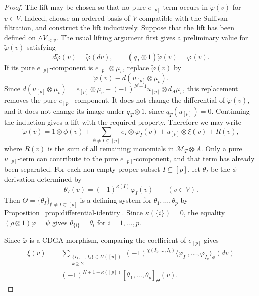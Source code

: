 \documentclass[a4paper,10pt]{amsart}
\theoremstyle{definition}
\theoremstyle{remark}
\numberwithin{equation}{section}
\begin{document}
\begin{proof}
The lift may be chosen so that no pure $e_{[p]}$-term occurs in
$\widetilde\varphi(v)$ for $v\in V$.
Indeed, choose an ordered basis of $V$ compatible with the Sullivan
filtration, and construct the lift inductively.
Suppose that the lift has been defined on $\wedge V_{<v}$.
The usual lifting argument first gives a preliminary value for
$\widetilde\varphi(v)$ satisfying
\[
d\widetilde\varphi(v)=\widetilde\varphi(dv),
\qquad
(q_T\otimes1)\widetilde\varphi(v)=\varphi(v).
\]
If its pure $e_{[p]}$-component is $e_{[p]}\otimes\mu_v$, replace
$\widetilde\varphi(v)$ by
\[
\widetilde\varphi(v)-d(u_{[p]}\otimes\mu_v).
\]
Since
$
d(u_{[p]}\otimes\mu_v)
=
e_{[p]}\otimes\mu_v
+
(-1)^{N-1}u_{[p]}\otimes d_A\mu_v$,
this replacement removes the pure $e_{[p]}$-component. It does not change
the differential of $\widetilde\varphi(v)$, and it does not change its image
under $q_T\otimes1$, since $q_T(u_{[p]})=0$.
Continuing the induction gives a lift with the required property.
Therefore we may write
\[
\widetilde\varphi(v)
=
1\otimes\phi(v)
+
\sum_{\emptyset\neq I\subsetneq[p]}
e_I\otimes\varphi_I(v)
+
u_{[p]}\otimes\xi(v)
+
R(v),
\]
where $R(v)$ is the sum of all remaining monomials in
$\mathcal M_T\otimes A$. Only a pure $u_{[p]}$-term can contribute to the
pure $e_{[p]}$-component, and that term has already been separated.
For each non-empty proper subset $I\subsetneq[p]$, let $\theta_I$ be the
$\phi$-derivation determined by
\[
        \theta_I(v)=(-1)^{\kappa(I)}\varphi_I(v)
        \qquad (v\in V).
\]
Then
$
\Theta=\{\theta_I\}_{\emptyset\neq I\subsetneq[p]}
$
is a defining system for $\theta_1,\ldots,\theta_p$ by
Proposition~\ref{prop:differential-identity}. 
Since $\kappa(\{i\})=0$, the equality
$
(\rho\otimes 1)\varphi=\psi
$
gives $\theta_{\{i\}}=\theta_i$ for $i=1,\ldots,p$.

Since $\widetilde\varphi$ is a CDGA morphism, comparing the coefficient of
$e_{[p]}$ gives
\begin{align*}
\xi(v)
&=
\sum_{\substack{\{I_1,\ldots,I_k\}\in\Pi([p])\\ k\geq 2}}
(-1)^{\chi(I_1,\ldots,I_k)}
\langle
\varphi_{I_1},\ldots,\varphi_{I_k}
\rangle_{\phi}(dv)                                      \\
&=
(-1)^{N+1+\kappa([p])}
[\theta_1,\ldots,\theta_p]_\Theta(v).
\end{align*}


\end{proof}
\end{document}
